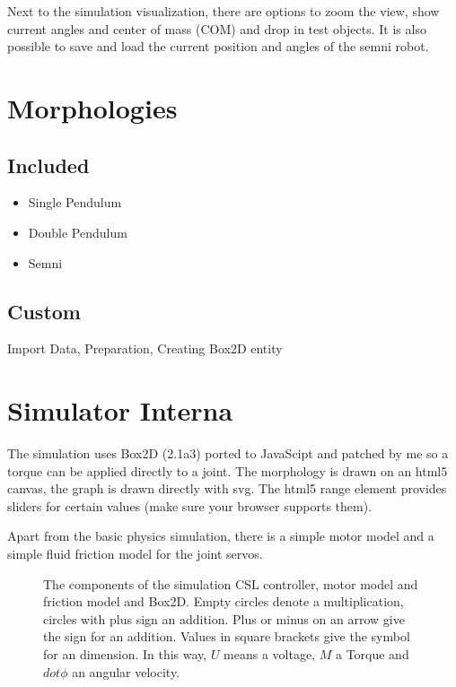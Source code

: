 \documentclass[10pt,a4paper]{article}
\begin{document}
Next to the simulation visualization, there are options to zoom the view, show current angles and center of mass (COM) and drop in test objects. It is also possible to save and load the current position and angles of the semni robot.

\section{Morphologies}
\subsection{Included}
\begin{itemize}
\item Single Pendulum
\item Double Pendulum
\item Semni
\end{itemize}

\subsection{Custom}

Import Data, Preparation, Creating Box2D entity

\section{Simulator Interna}
\label{sim_internal}

The simulation uses Box2D (2.1a3) ported to JavaScipt and patched by me so a torque
can be applied directly to a joint.
The morphology is drawn on an html5 canvas, the graph is drawn directly with svg.
The html5 range element provides sliders for certain values (make sure your browser supports them).

Apart from the basic physics simulation, there is a simple motor model and a simple fluid friction model for the joint servos.

\begin{figure}[H]
    \centering
    
    \caption{The components of the simulation CSL controller, motor model and
    friction model and Box2D. Empty circles denote a multiplication, circles with plus sign
    an addition. Plus or minus on an arrow give the sign for an addition.
    Values in square brackets give the symbol for an dimension. In this way, $U$ means
    a voltage, $M$ a Torque and $dot{\phi}$ an angular velocity.}
    \label{fig:controllermodell}
\end{figure}
\end{document}

